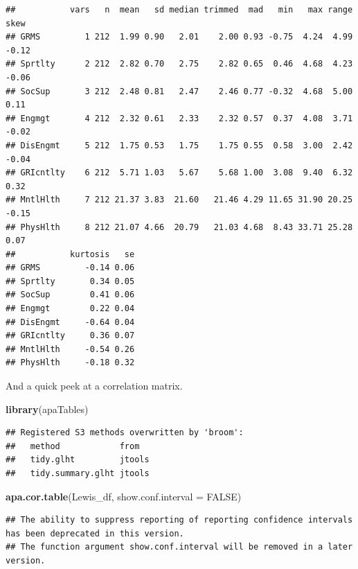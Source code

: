 \documentclass[
  11pt,
]{book}
\newenvironment{Shaded}{\begin{snugshade}}{\end{snugshade}}
\newcommand{\AttributeTok}[1]{\textcolor[rgb]{0.27,0.27,0.27}{#1}}
\newcommand{\ConstantTok}[1]{\textcolor[rgb]{0.37,0.37,0.37}{#1}}
\newcommand{\FunctionTok}[1]{\textcolor[rgb]{0.27,0.27,0.27}{\textbf{#1}}}
\newcommand{\NormalTok}[1]{#1}
\begin{document}
\begin{verbatim}
##           vars   n  mean   sd median trimmed  mad   min   max range  skew
## GRMS         1 212  1.99 0.90   2.01    2.00 0.93 -0.75  4.24  4.99 -0.12
## Sprtlty      2 212  2.82 0.70   2.75    2.82 0.65  0.46  4.68  4.23 -0.06
## SocSup       3 212  2.48 0.81   2.47    2.46 0.77 -0.32  4.68  5.00  0.11
## Engmgt       4 212  2.32 0.61   2.33    2.32 0.57  0.37  4.08  3.71 -0.02
## DisEngmt     5 212  1.75 0.53   1.75    1.75 0.55  0.58  3.00  2.42 -0.04
## GRIcntlty    6 212  5.71 1.03   5.67    5.68 1.00  3.08  9.40  6.32  0.32
## MntlHlth     7 212 21.37 3.83  21.60   21.46 4.29 11.65 31.90 20.25 -0.15
## PhysHlth     8 212 21.07 4.66  20.79   21.03 4.68  8.43 33.71 25.28  0.07
##           kurtosis   se
## GRMS         -0.14 0.06
## Sprtlty       0.34 0.05
## SocSup        0.41 0.06
## Engmgt        0.22 0.04
## DisEngmt     -0.64 0.04
## GRIcntlty     0.36 0.07
## MntlHlth     -0.54 0.26
## PhysHlth     -0.18 0.32
\end{verbatim}

And a quick peek at a correlation matrix.

\begin{Shaded}
\begin{Highlighting}[]
\FunctionTok{library}\NormalTok{(apaTables)}
\end{Highlighting}
\end{Shaded}

\begin{verbatim}
## Registered S3 methods overwritten by 'broom':
##   method            from  
##   tidy.glht         jtools
##   tidy.summary.glht jtools
\end{verbatim}

\begin{Shaded}
\begin{Highlighting}[]
\FunctionTok{apa.cor.table}\NormalTok{(Lewis\_df, }\AttributeTok{show.conf.interval =} \ConstantTok{FALSE}\NormalTok{)}
\end{Highlighting}
\end{Shaded}

\begin{verbatim}
## The ability to suppress reporting of reporting confidence intervals has been deprecated in this version.
## The function argument show.conf.interval will be removed in a later version.
\end{verbatim}
\end{document}
